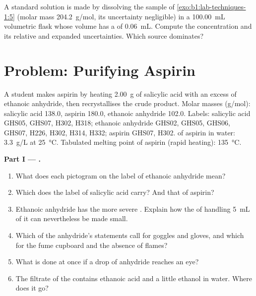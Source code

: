 \begin{exercise}[$\star\star\star$]\label{exo:b1:lab-techniques-1:12}
A standard solution is made by dissolving the sample of
\cref{exo:b1:lab-techniques-1:5} (molar mass \qty{204.2}{g/mol}, its
uncertainty negligible) in a \qty{100.00}{mL} volumetric flask whose
volume has a  of \qty{0.06}{mL}. Compute the
concentration and its relative and expanded uncertainties. Which source
dominates?
\end{exercise}

\section{Problem: Purifying Aspirin}

\begin{problem}
\label{pb:b1:lab-techniques-1:1}
A student makes aspirin by heating \qty{2.00}{g} of salicylic acid with an
excess of ethanoic anhydride, then recrystallises the crude product.
Molar masses (\unit{g/mol}): salicylic acid  138.0, aspirin
 180.0, ethanoic anhydride  102.0. Labels:
salicylic acid GHS05, GHS07, H302, H318; ethanoic anhydride GHS02,
GHS05, GHS06, GHS07, H226, H302, H314, H332; aspirin GHS07, H302.
 of aspirin in water: \qty{3.3}{g/L} at \qty{25}{\celsius}.
Tabulated melting point of aspirin (rapid heating): \qty{135}{\celsius}.

\medskip
\noindent\textbf{Part I --- .}
\begin{enumerate}
  \item What does each pictogram on the label of ethanoic anhydride mean?
  \item Which  does the label of salicylic acid carry? And that
        of aspirin?
  \item Ethanoic anhydride has the more severe . Explain how the
         of handling \qty{5}{mL} of it can nevertheless be made small.
  \item Which of the anhydride's statements call for goggles and gloves,
        and which for the fume cupboard and the absence of flames?
  \item What is done at once if a drop of anhydride reaches an eye?
  \item The filtrate of the  contains ethanoic acid and a
        little ethanol in water. Where does it go?
\end{enumerate}


\end{problem}
